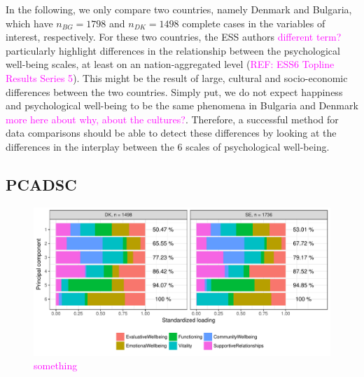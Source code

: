 \documentclass[titlepage,11pt,twoside]{article}
\newcommand{\hl}[1]{\textcolor{magenta}{#1}}
\begin{document}
In the following, we only compare two countries, namely Denmark and Bulgaria, which have $n_{BG} = 1798$ and $n_{DK} = 1498$ complete cases in the variables of interest, respectively. For these two countries, the ESS authors \hl{different term?} particularly highlight differences in the relationship between the psychological well-being scales, at least on an nation-aggregated level (\hl{REF: ESS6 Topline Results Series 5}). This might be the result of large, cultural and socio-economic differences between the two countries. Simply put, we do not expect happiness and psychological well-being to be the same phenomena in Bulgaria and Denmark \hl{more here about why, about the cultures?}. Therefore, a successful method for data comparisons should be able to detect these differences by looking at the differences in the interplay between the 6 scales of psychological well-being.

\subsection{PCADSC}
\begin{figure}
\center
\includegraphics[scale = 0.8]{essPCADSC.pdf}
\caption{\hl{something}}
\label{plotESSPCADSC}
\end{figure}
\end{document}
